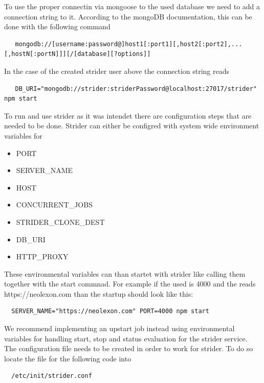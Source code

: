 To use the proper connectin via mongoose to the used database we need to add a connection string to it. According to the mongoDB
documentation, this can be done with the following command
\begin{lstlisting}
   mongodb://[username:password@]host1[:port1][,host2[:port2],...[,hostN[:portN]]][/[database][?options]]
\end{lstlisting}
In the case of the created strider user above the connection string reads
\begin{lstlisting}
   DB_URI="mongodb://strider:striderPassword@localhost:27017/strider" npm start
\end{lstlisting}

To run and use strider as it was intendet there are configuration steps that are needed to be done. Strider can either be configred
with system wide environment variables for

\begin{itemize}
  \item PORT
  \item SERVER_NAME
  \item HOST
  \item CONCURRENT_JOBS
  \item STRIDER_CLONE_DEST
  \item DB_URI
  \item HTTP_PROXY
\end{itemize}

These environmental variables can than startet with strider like calling them together with the start commnad. For example if the used 
is 4000 and the  reads https://neolexon.com than the startup should look like this:

\begin{lstlisting}
  SERVER_NAME="https://neolexon.com" PORT=4000 npm start
\end{lstlisting}

We recommend implementing an upstart job instead using environmental variables for handling start, stop and status evaluation for the strider service.
The configuration file needs to be created in order to work for strider. To do so locate the file for the following code into

\begin{lstlisting}
  /etc/init/strider.conf
\end{lstlisting}




